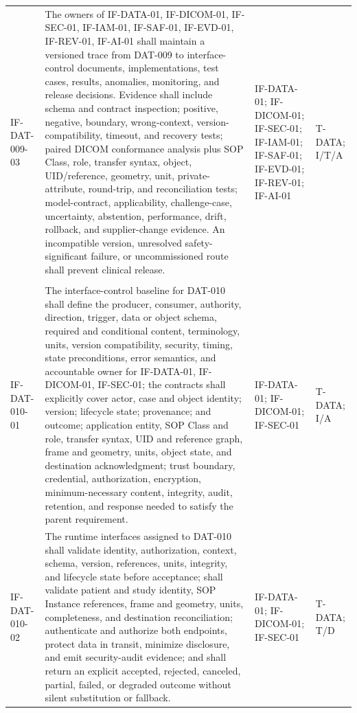 \documentclass[11pt,letterpaper]{article}
\begin{document}
\begin{scriptsize}
\begin{longtable}{@{}L{0.14\textwidth}L{0.49\textwidth}L{0.19\textwidth}L{0.10\textwidth}@{}}
\addlinespace[2pt]
\mbox{IF-DAT-009-03} & The owners of IF-DATA-01, IF-DICOM-01, IF-SEC-01, IF-IAM-01, IF-SAF-01, IF-EVD-01, IF-REV-01, IF-AI-01 shall maintain a versioned trace from DAT-009 to interface-control documents, implementations, test cases, results, anomalies, monitoring, and release decisions. Evidence shall include schema and contract inspection; positive, negative, boundary, wrong-context, version-compatibility, timeout, and recovery tests; paired DICOM conformance analysis plus SOP Class, role, transfer syntax, object, UID\slash\allowbreak{}reference, geometry, unit, private-attribute, round-trip, and reconciliation tests; model-contract, applicability, challenge-case, uncertainty, abstention, performance, drift, rollback, and supplier-change evidence. An incompatible version, unresolved safety-significant failure, or uncommissioned route shall prevent clinical release. & IF-DATA-01; IF-DICOM-01; IF-SEC-01; IF-IAM-01; IF-SAF-01; IF-EVD-01; IF-REV-01; IF-AI-01 & T-DATA; I\slash\allowbreak{}T\slash\allowbreak{}A \\
\addlinespace[2pt]
 \\
\addlinespace[2pt]
\mbox{IF-DAT-010-01} & The interface-control baseline for DAT-010 shall define the producer, consumer, authority, direction, trigger, data or object schema, required and conditional content, terminology, units, version compatibility, security, timing, state preconditions, error semantics, and accountable owner for IF-DATA-01, IF-DICOM-01, IF-SEC-01; the contracts shall explicitly cover actor, case and object identity; version; lifecycle state; provenance; and outcome; application entity, SOP Class and role, transfer syntax, UID and reference graph, frame and geometry, units, object state, and destination acknowledgment; trust boundary, credential, authorization, encryption, minimum-necessary content, integrity, audit, retention, and response needed to satisfy the parent requirement. & IF-DATA-01; IF-DICOM-01; IF-SEC-01 & T-DATA; I\slash\allowbreak{}A \\
\addlinespace[2pt]
\mbox{IF-DAT-010-02} & The runtime interfaces assigned to DAT-010 shall validate identity, authorization, context, schema, version, references, units, integrity, and lifecycle state before acceptance; shall validate patient and study identity, SOP Instance references, frame and geometry, units, completeness, and destination reconciliation; authenticate and authorize both endpoints, protect data in transit, minimize disclosure, and emit security-audit evidence; and shall return an explicit accepted, rejected, canceled, partial, failed, or degraded outcome without silent substitution or fallback. & IF-DATA-01; IF-DICOM-01; IF-SEC-01 & T-DATA; T\slash\allowbreak{}D \\

\end{longtable}
\end{scriptsize}
\end{document}
